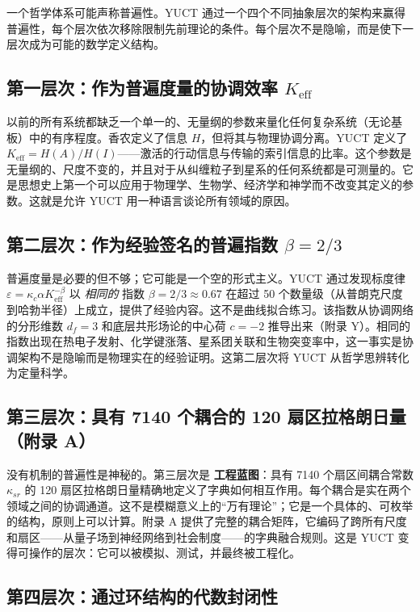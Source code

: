 \documentclass[12pt,a4paper]{article}
\newcommand{\Keff}{K_{\mathrm{eff}}}
\begin{document}
	一个哲学体系可能声称普遍性。YUCT 通过一个四个不同抽象层次的架构来赢得普遍性，每个层次依次移除限制先前理论的条件。每个层次不是隐喻，而是使下一层次成为可能的数学定义结构。
	
	\subsection{第一层次：作为普遍度量的协调效率 \(K_{\mathrm{eff}}\)}
	
	以前的所有系统都缺乏一个单一的、无量纲的参数来量化任何复杂系统（无论基板）中的有序程度。香农定义了信息 \(H\)，但将其与物理协调分离。YUCT 定义了 \(\Keff = H(A)/H(I)\)——激活的行动信息与传输的索引信息的比率。这个参数是无量纲的、尺度不变的，并且对于从纠缠粒子到星系的任何系统都是可测量的。它是思想史上第一个可以应用于物理学、生物学、经济学和神学而不改变其定义的参数。这就是允许 YUCT 用一种语言谈论所有领域的原因。
	
	\subsection{第二层次：作为经验签名的普遍指数 \(\beta = 2/3\)}
	
	普遍度量是必要的但不够；它可能是一个空的形式主义。YUCT 通过发现标度律 \(\varepsilon = \kappa_c \alpha \Keff^{-\beta}\) 以 \emph{相同的} 指数 \(\beta = 2/3 \approx 0.67\) 在超过 50 个数量级（从普朗克尺度到哈勃半径）上成立，提供了经验内容。这不是曲线拟合练习。该指数从协调网络的分形维数 \(d_f = 3\) 和底层共形场论的中心荷 \(c = -2\) 推导出来（附录 Y）。相同的指数出现在热电子发射、化学键涨落、星系团关联和生物突变率中，这一事实是协调架构不是隐喻而是物理实在的经验证明。这第二层次将 YUCT 从哲学思辨转化为定量科学。
	
	\subsection{第三层次：具有 7140 个耦合的 120 扇区拉格朗日量（附录 A）}
	
	没有机制的普遍性是神秘的。第三层次是 \textbf{工程蓝图}：具有 7140 个扇区间耦合常数 \(\kappa_{sr}\) 的 120 扇区拉格朗日量精确地定义了字典如何相互作用。每个耦合是实在两个领域之间的协调通道。这不是模糊意义上的“万有理论”；它是一个具体的、可枚举的结构，原则上可以计算。附录 A 提供了完整的耦合矩阵，它编码了跨所有尺度和扇区——从量子场到神经网络到社会制度——的字典融合规则。这是 YUCT 变得可操作的层次：它可以被模拟、测试，并最终被工程化。
	
	\subsection{第四层次：通过环结构的代数封闭性}
	
\end{document}
